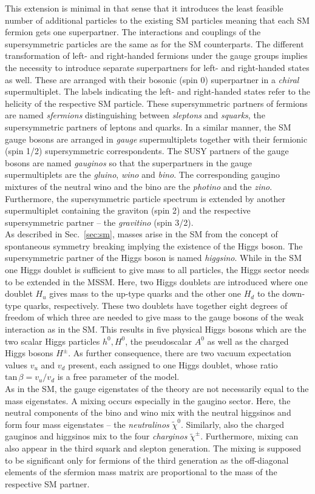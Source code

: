 This extension is minimal in that sense that it introduces the least feasible number of additional particles to the existing SM particles meaning that each SM fermion gets one superpartner. The interactions and couplings of the supersymmetric particles are the same as for the SM counterparts. The different transformation of left- and right-handed fermions under the gauge groups implies the necessity to introduce separate superpartners for left- and right-handed states as well. These are arranged with their bosonic (spin 0) superpartner in a \textit{chiral} supermultiplet. The labels indicating the left- and right-handed states refer to the helicity of the respective SM particle. These supersymmetric partners of fermions are named \textit{sfermions} distinguishing between \textit{sleptons} and \textit{squarks}, the supersymmetric partners of leptons and quarks. In a similar manner, the SM gauge bosons are arranged in \textit{gauge} supermultiplets together with their fermionic (spin 1/2) supersymmetric correspondents. The SUSY partners of the gauge bosons are named \textit{gauginos} so that the superpartners in the gauge supermultiplets are the \textit{gluino}, \textit{wino} and \textit{bino}. The corresponding gaugino mixtures of the neutral wino and the bino are the \textit{photino} and the \textit{zino}. Furthermore, the supersymmetric particle spectrum is extended by another supermultiplet containing the graviton (spin 2) and the respective supersymmetric partner -- the \textit{gravitino} (spin 3/2). \\
As described in Sec.~\ref{sec:sm}, masses arise in the SM from the concept of spontaneous symmetry breaking implying the existence of the Higgs boson. The supersymmetric partner of the Higgs boson is named \textit{higgsino}. While in the SM one Higgs doublet is sufficient to give mass to all particles, the Higgs sector needs to be extended in the MSSM. Here, two Higgs doublets are introduced where one doublet $H_u$ gives mass to the up-type quarks and the other one $H_d$ to the down-type quarks, respectively. These two doublets have together eight degrees of freedom of which three are needed to give mass to the gauge bosons of the weak interaction as in the SM. This results in five physical Higgs bosons which are the two scalar Higgs particles $h^0, H^0$, the pseudoscalar $A^0$ as well as the charged Higgs bosons $H^{\pm}$. As further consequence, there are two vacuum expectation values $v_u$ and $v_d$ present, each assigned to one Higgs doublet, whose ratio $\mathrm{tan} \, \beta = v_u/v_d$ is a free parameter of the model. \\
As in the SM, the gauge eigenstates of the theory are not necessarily equal to the mass eigenstates. A mixing occurs especially in the gaugino sector. Here, the neutral components of the bino and wino mix with the neutral higgsinos and form four mass eigenstates -- the \textit{neutralinos} $\tilde{\chi}^0$. Similarly, also the charged gauginos and higgsinos mix to the four \textit{charginos} $\tilde{\chi}^{\pm}$. Furthermore, mixing can also appear in the third squark and slepton generation. The mixing is supposed to be significant only for fermions of the third generation as the off-diagonal elements of the sfermion mass matrix are proportional to the mass of the respective SM partner. 


